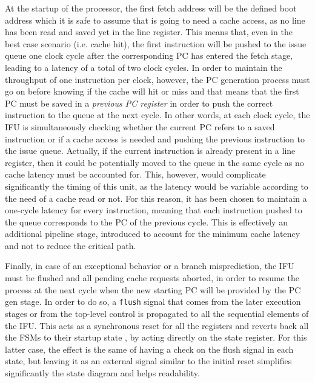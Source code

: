 At the startup of the processor, the first fetch address will be the defined boot address which it is safe to assume that is going to need a cache access, as no line has been read and saved yet in the line register. This means that, even in the best case scenario (i.e. cache hit), the first instruction will be pushed to the issue queue one clock cycle after the corresponding \ac{PC} has entered the fetch stage, leading to a latency of a total of two clock cycles. In order to maintain the throughput of one instruction per clock, however, the \ac{PC} generation process must go on before knowing if the cache will hit or miss and that means that the first \ac{PC} must be saved in a \emph{previous \ac{PC} register} in order to push the correct instruction to the queue at the next cycle. In other words, at each clock cycle, the \ac{IFU} is simultaneously checking whether the current \ac{PC} refers to a saved instruction or if a cache access is needed and pushing the previous instruction to the issue queue. Actually, if the current instruction is already present in a line register, then it could be potentially moved to the queue in the same cycle as no cache latency must be accounted for. This, however, would complicate significantly the timing of this unit, as the latency would be variable according to the need of a cache read or not. For this reason, it has been chosen to maintain a one-cycle latency for every instruction, meaning that each instruction pushed to the queue corresponds to the \ac{PC} of the previous cycle. This is effectively an additional pipeline stage, introduced to account for the minimum cache latency and not to reduce the critical path.

Finally, in case of an exceptional behavior or a branch misprediction, the \ac{IFU} must be flushed and all pending cache requests aborted, in order to resume the process at the next cycle when the new starting \ac{PC} will be provided by the \ac{PC} gen stage. In order to do so, a \texttt{flush} signal that comes from the later execution stages or from the top-level control is propagated to all the sequential elements of the \ac{IFU}. This acts as a synchronous reset for all the registers and reverts back all the \acsp{FSM} to their startup state \cite{resets}, by acting directly on the state register. For this latter case, the effect is the same of having a check on the flush signal in each state, but leaving it as an external signal similar to the initial reset simplifies significantly the state diagram and helps readability.


